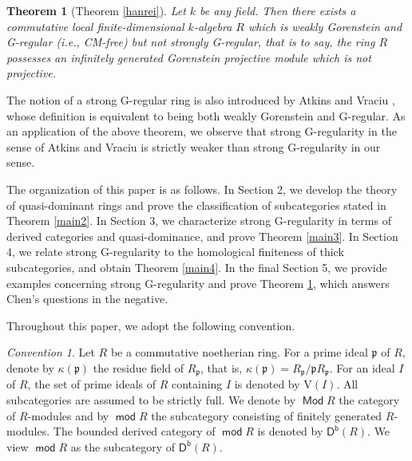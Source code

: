 \documentclass{amsart}
\newtheorem{thm}{Theorem}[section]
\theoremstyle{definition}
\theoremstyle{remark}
\newtheorem*{conv}{Convention}
\numberwithin{equation}{thm}
\def\Db{\operatorname{\mathsf{D^b}}}
\def\Mod{\operatorname{\mathsf{Mod}}}
\def\mod{\operatorname{\mathsf{mod}}}
\def\p{\mathfrak{p}}
\def\V{\mathrm{V}}
\begin{document}
\begin{thm}[Theorem \ref{hanrei}]\label{main1}
Let $k$ be any field.
Then there exists a commutative local finite-dimensional $k$-algebra $R$ which is weakly Gorenstein and G-regular (i.e., CM-free) but not strongly G-regular, that is to say, the ring $R$ possesses an infinitely generated Gorenstein projective module which is not projective.
\end{thm}

\noindent
The notion of a strong G-regular ring is also introduced by Atkins and Vraciu \cite{AV}, whose definition is equivalent to being both weakly Gorenstein and G-regular.
As an application of the above theorem, we observe that strong G-regularity in the sense of Atkins and Vraciu is strictly weaker than strong G-regularity in our sense.

The organization of this paper is as follows.
In Section 2, we develop the theory of quasi-dominant rings and prove the classification of subcategories stated in Theorem \ref{main2}.
In Section 3, we characterize strong G-regularity in terms of derived categories and quasi-dominance, and prove Theorem \ref{main3}.
In Section 4, we relate strong G-regularity to the homological finiteness of thick subcategories, and obtain Theorem \ref{main4}.
In the final Section 5, we provide examples concerning strong G-regularity and prove Theorem \ref{main1}, which answers Chen's questions in the negative.

Throughout this paper, we adopt the following convention.
\begin{conv}
Let $R$ be a commutative noetherian ring. 
For a prime ideal $\p$ of $R$, denote by $\kappa(\p)$ the residue field of $R_\p$, that is, $\kappa(\p)=R_\p/\p R_\p$.
For an ideal $I$ of $R$, the set of prime ideals of $R$ containing $I$ is denoted by $\V(I)$.
All subcategories are assumed to be strictly full.
We denote by $\Mod R$ the category of $R$-modules and by $\mod R$ the subcategory consisting of finitely generated $R$-modules. 
The bounded derived category of $\mod R$ is denoted by $\Db(R)$.
We view $\mod R$ as the subcategory of $\Db(R)$.
\end{conv}
\end{document}
